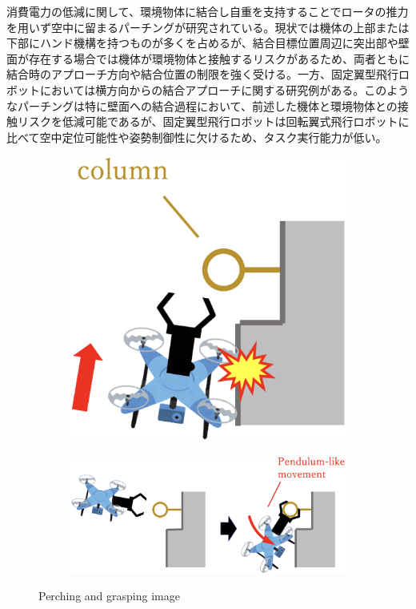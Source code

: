 \documentclass{jarticle}
\begin{document}
消費電力の低減に関して、環境物体に結合し自重を支持することでロータの推力を用いず空中に留まるパーチングが研究されている。現状では機体の上部または下部にハンド機構を持つものが多くを占めるが、結合目標位置周辺に突出部や壁面が存在する場合では機体が環境物体と接触するリスクがあるため、両者ともに結合時のアプローチ方向や結合位置の制限を強く受ける。一方、固定翼型飛行ロボットにおいては横方向からの結合アプローチに関する研究例がある。このようなパーチングは特に壁面への結合過程において、前述した機体と環境物体との接触リスクを低減可能であるが、固定翼型飛行ロボットは回転翼式飛行ロボットに比べて空中定位可能性や姿勢制御性に欠けるため、タスク実行能力が低い。
\begin{figure}[tb]
  \centering
  \begin{subfigure}{0.25\columnwidth}
    \includegraphics[width=\textwidth]{figs/collision.eps}
    \vspace{-6mm}
    \caption{}
    \label{fig:pgimage}
  \end{subfigure}
  \begin{subfigure}{0.68\columnwidth}
    \includegraphics[width=\textwidth]{figs/perching_grasping.eps}
    \vspace{-6mm}
    \caption{}
    \label{fig:pgimage}
  \end{subfigure}
  \vspace{2mm}
  \caption{Perching and grasping image}
  \vspace{-5mm}
\end{figure}
\end{document}
